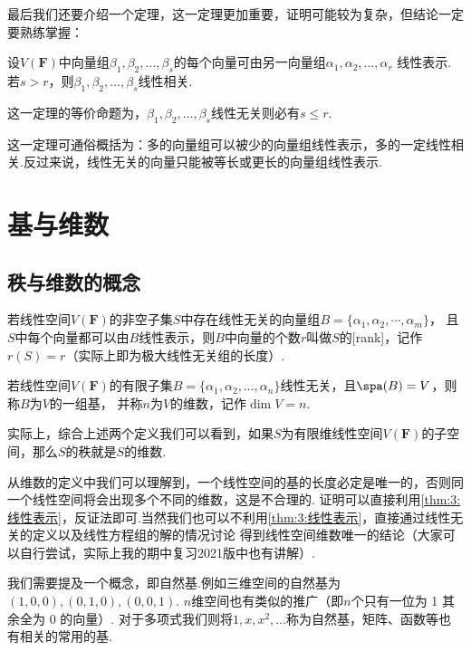 最后我们还要介绍一个定理，这一定理更加重要，证明可能较为复杂，但结论一定要熟练掌握：
\begin{theorem}\label{thm:3:线性表示}
    设$V(\mathbf{F})$中向量组$ \beta_1,\beta_2,\ldots,\beta_s $的每个向量可由另一向量组$\alpha_1,\alpha_2,\ldots,\alpha_r$
    线性表示.若$s>r$，则$ \beta_1,\beta_2,\ldots,\beta_s $线性相关.
\end{theorem}
这一定理的等价命题为，$ \beta_1,\beta_2,\ldots,\beta_s $线性无关则必有$s\leqslant r$.

这一定理可通俗概括为：多的向量组可以被少的向量组线性表示，多的一定线性相关.反过来说，线性无关的向量只能被等长或更长的向量组线性表示.

\section{基与维数}
\subsection{秩与维数的概念}
\begin{definition}
	若线性空间$V(\mathbf{F})$的非空子集$S$中存在线性无关的向量组$B=\{\alpha_1,\alpha_2,\cdots,\alpha_m\}$，
	且$S$中每个向量都可以由$B$线性表示，则$B$中向量的个数$r$叫做$S$的[rank]，记作$r(S)= r$（实际上即为极大线性无关组的长度）.
\end{definition}
\begin{definition}
    若线性空间$V(\mathbf{F})$的有限子集$B=\{\alpha_1,\alpha_2,\ldots,\alpha_n\}$线性无关，且$\spa(B) = V$，则称$B$为$V$的一组基，
    并称$n$为$V$的维数，记作$\dim V = n$.
\end{definition}
实际上，综合上述两个定义我们可以看到，如果$S$为有限维线性空间$V(\mathbf{F})$的子空间，那么$S$的秩就是$S$的维数.

从维数的定义中我们可以理解到，一个线性空间的基的长度必定是唯一的，否则同一个线性空间将会出现多个不同的维数，这是不合理的.
证明可以直接利用\autoref{thm:3:线性表示}，反证法即可.当然我们也可以不利用\autoref*{thm:3:线性表示}，直接通过线性无关的定义以及线性方程组的解的情况讨论
得到线性空间维数唯一的结论（大家可以自行尝试，实际上我的期中复习2021版中也有讲解）.

我们需要提及一个概念，即自然基.例如三维空间的自然基为$(1,0,0),(0,1,0),(0,0,1)$. $n$维空间也有类似的推广（即$n$个只有一位为 1 其余全为 0 的向量）.
对于多项式我们则将$1,x,x^2,\ldots$称为自然基，矩阵、函数等也有相关的常用的基.

